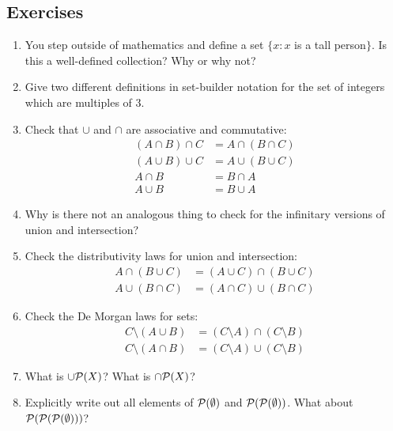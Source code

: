 \documentclass[10pt]{amsart}
\begin{document}
\subsection*{Exercises}

\begin{enumerate}
\item You step outside of mathematics and define a set $\{ x : x$ is a tall person$\}$. Is this a well-defined collection? Why or why not?

\item Give two different definitions in set-builder notation for the set of integers which are multiples of $3$.

\item Check that $\cup$ and $\cap$ are associative and commutative:
\begin{align*}
(A \cap B) \cap C &= A \cap (B \cap C) \\
(A \cup B) \cup C &= A \cup (B \cup C) \\
A \cap B &= B \cap A \\
A \cup B &= B \cup A
\end{align*}

\item Why is there not an analogous thing to check for the infinitary versions of union and intersection?

\item Check the distributivity laws for union and intersection:
\begin{align*}
A \cap (B \cup C) &= (A \cup C) \cap (B \cup C) \\
A \cup (B \cap C) &= (A \cap C) \cup (B \cap C) 
\end{align*}

\item Check the De Morgan laws for sets:
\begin{align*}
C \setminus (A \cup B) &= (C \setminus A) \cap (C \setminus B) \\
C \setminus (A \cap B) &= (C \setminus A) \cup (C \setminus B) 
\end{align*}


\item What is $\cup \mathcal{P}(X)$? What is $\cap \mathcal{P}(X)$?

\item Explicitly write out all elements of $\mathcal{P}(\emptyset)$ and $\mathcal{P}(\mathcal{P}(\emptyset))$. What about $\mathcal{P}(\mathcal{P}(\mathcal{P}(\emptyset)))$?
\end{enumerate}
\end{document}
